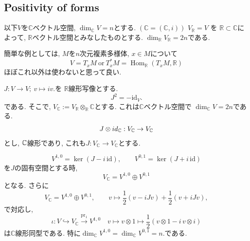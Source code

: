 \subsection{Positivity of forms}
以下\(V\)を\(\mathbb{C}\)ベクトル空間,
 \(\dim_{\mathbb{C}}V=n\)とする. \((\mathbb{C}=(\mathbb{C},i))\)
\(V_{\mathbb{R}}=V\) を \(\mathbb{R}\subset \mathbb{C}\)によって,  \(\mathbb{R}\)ベクトル空間とみなしたものとする. \(\dim_{\mathbb{R}}V_{\mathbb{R}}=2n\)である. 

\begin{tcolorbox}[mybox]
簡単な例としては, $M$を$n$次元複素多様体, $x \in M$について
\[
V=T_{x}M \ \text{or}\ T_{x}^{*}M=\operatorname{Hom}_{\mathbb{R}}(T_{x}M,\mathbb{R})
\]
ほぼこれ以外は使わないと思って良い. 
\end{tcolorbox}
 \(J:V\to V;\ v\mapsto iv.\)を \(\mathbb{R}\text{線形写像}\)とする. 
\[
 J^{2}=-\mathrm{id}_{V}.
\]
である. 
そこで, \(V_{\mathbb{C}}:=V_{\mathbb{R}}\otimes_{\mathbb{R}}\mathbb{C}\)とする. 
これは\(\mathbb{C}\)ベクトル空間で \(\dim_{\mathbb{C}}V=2n\)である. 
 \[
J \otimes id_{\mathbb{C}}:V_{\mathbb{C}}\to V_{\mathbb{C}}
\]
とし, $\mathbb{C}$線形であり, これも$J : V_{\mathbb{C}}\to V_{\mathbb{C}}$とする. 


\begin{tcolorbox}[mybox]
\begin{lem}
\label{lem-M-4.3.3}
\[
V^{1,0}=\ker(J-i\,\mathrm{id}),\qquad V^{0,1}=\ker(J+i\,\mathrm{id})
\]
を\(J\)の固有空間とする時, 
\[
V_{\mathbb{C}}=V^{1,0}\oplus V^{0,1}
\]
となる. 
さらに
\[
V_{\mathbb{C}}=V^{1,0}\oplus V^{0,1},
\qquad
v\mapsto \frac{1}{2}(v-iJv)+\frac{1}{2}(v+iJv),
\]
で対応し, 
\[
\iota: V \hookrightarrow  V_{\mathbb{C}}\xrightarrow{\mathrm{pr}_{1}}V^{1,0}
\quad 
v\mapsto v\otimes 1\mapsto \frac{1}{2}(v\otimes 1-i\,v\otimes i)
\]
は\(\mathbb{C}\)線形同型である. 
特に\(\dim_{\mathbb{C}}V^{1,0}=\dim_{\mathbb{C}}V^{0,1}=n.\)である. 
\end{lem}
\end{tcolorbox}

